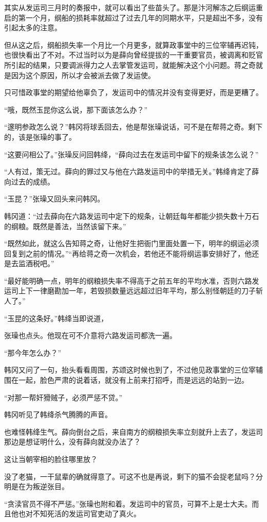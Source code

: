 其实从发运司三月时的奏报中，就可以看出了些苗头了。那是汴河解冻之后纲运重启的第一个月，纲船的损耗率就超过了过去几年的同期水平，只是超出不多，没有引起太多的注意。

但从这之后，纲船损失率一个月比一个月更多，就算政事堂中的三位宰辅再迟钝，也很快看出了不对。不过当时以为是薛向曾经提拔的一干重要官员，被调离和贬官所引起的结果，只要调派得力之人去掌管发运司，就能解决这个小问题。蒋之奇就是因为这个原因，所以才会被派去做了发运使。

只可惜政事堂的期望给他辜负了，发运司中的情况并没有变得更好，而是更糟了。

“哦，既然玉昆你这么说，那下面该怎么办？”

“邃明参政怎么说？”韩冈将球丢回去，他是帮张璪说话，可不是在帮蒋之奇。剩下的，该是张璪的事了。

“这要问相公了。”张璪反问回韩绛，“薛向过去在发运司中留下的规条该怎么说？”

“人有过，策无过。薛向的罪过又与他在六路发运司中的举措无关。”韩绛肯定了薛向过去的成绩。

“玉昆？”张璪又回头来问韩冈。

韩冈道：“过去薛向在六路发运司中定下的规条，让朝廷每年都能少损失数十万石的纲粮。既然是善法，当然该留下来。”

“既然如此，就这么告知蒋之奇，让他好生把衙门里面处置一下，明年的纲运必须回复到之前的情况。”“再给蒋之奇一次机会，若他还不能将纲运事安排好了，他还是去监酒税吧。”

“最好能明确一点，明年的纲粮损失率不得高于之前五年的平均水准，否则六路发运司上下一律磨勘加一年，若毁损数量远远超过旧年平均，那么别怪朝廷的刀子斩人了。”

“玉昆的这条好。”韩绛当即说道，

张璪也点头。他现在可不介意将六路发运司都洗一遍。

“那今年怎么办？”

韩冈又问了一句，抬头看看周围，苏颂这时候也到了，不过他见政事堂的三位宰辅围在一起，脸色严肃的说着话，就没有上前来打招呼，而是远远的站到一边。

“对那一帮奸猾贼子，必须严惩不贷。”

韩冈听见了韩绛杀气腾腾的声音。

也难怪韩绛生气。薛向倒台之后，来自南方的纲粮损失率立刻就升上去了，发运司那边是想证明什么，没有薛向就没办法了？

这让当朝宰相的脸往哪里放？

没了老猫，一干鼠辈的确就得意了。可这不也是再说，剩下的猫不会捉老鼠吗？分明是在为叛逆张目。

“贪渎官员不得不严惩。”张璪也附和着。发运司中的官员，可算不上是士大夫。而且他也对不知死活的发运司官吏动了真火。

